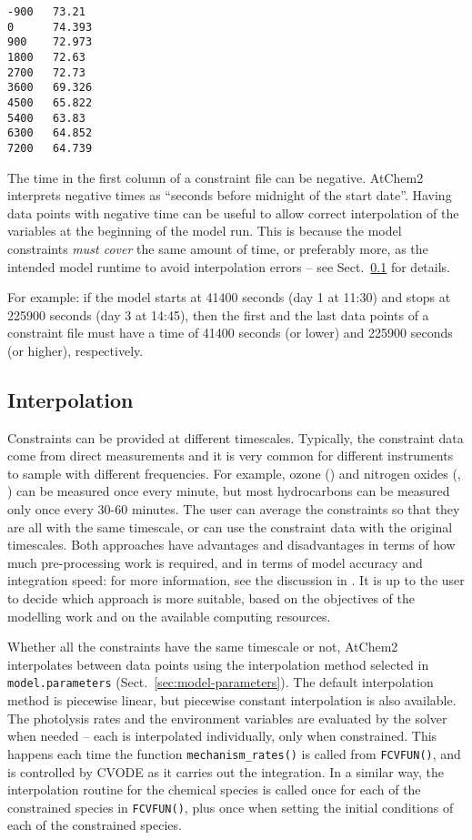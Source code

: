 \begin{verbatim}
-900   73.21
0      74.393
900    72.973
1800   72.63
2700   72.73
3600   69.326
4500   65.822
5400   63.83
6300   64.852
7200   64.739
\end{verbatim}

The time in the first column of a constraint file can be negative.
AtChem2 interprets negative times as ``seconds before midnight of the
start date''. Having data points with negative time can be useful to
allow correct interpolation of the variables at the beginning of the
model run. This is because the model constraints \emph{must cover} the
same amount of time, or preferably more, as the intended model runtime
to avoid interpolation errors -- see Sect.~\ref{subsec:interpolation}
for details.

For example: if the model starts at 41400 seconds (day 1 at 11:30) and
stops at 225900 seconds (day 3 at 14:45), then the first and the last
data points of a constraint file must have a time of 41400 seconds (or
lower) and 225900 seconds (or higher), respectively.

\subsection{Interpolation} \label{subsec:interpolation}

Constraints can be provided at different timescales. Typically, the
constraint data come from direct measurements and it is very common
for different instruments to sample with different frequencies. For
example, ozone () and nitrogen oxides (, ) can
be measured once every minute, but most hydrocarbons can be measured
only once every 30-60 minutes. The user can average the constraints so
that they are all with the same timescale, or can use the constraint
data with the original timescales. Both approaches have advantages and
disadvantages in terms of how much pre-processing work is required,
and in terms of model accuracy and integration speed: for more
information, see the discussion in \citet{sommariva_2020}. It is up to
the user to decide which approach is more suitable, based on the
objectives of the modelling work and on the available computing
resources.

Whether all the constraints have the same timescale or not, AtChem2
interpolates between data points using the interpolation method
selected in \texttt{model.parameters} (Sect.~\ref{sec:model-parameters}).
The default interpolation method is piecewise linear, but piecewise
constant interpolation is also available. The photolysis rates and the
environment variables are evaluated by the solver when needed -- each
is interpolated individually, only when constrained. This happens each
time the function \texttt{mechanism\_rates()} is called from
\texttt{FCVFUN()}, and is controlled by CVODE as it carries out the
integration. In a similar way, the interpolation routine for the
chemical species is called once for each of the constrained species in
\texttt{FCVFUN()}, plus once when setting the initial conditions of
each of the constrained species.

